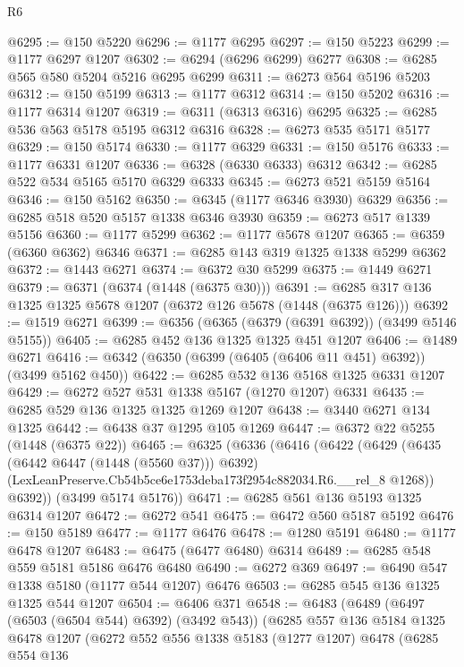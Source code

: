 \begin{lexlean}{R6}
\begin{coremodule}
@6295 := @150 @5220
@6296 := @1177 @6295
@6297 := @150 @5223
@6299 := @1177 @6297 @1207
@6302 := @6294 (@6296 @6299) @6277
@6308 := @6285 @565 @580 @5204 @5216 @6295 @6299
@6311 := @6273 @564 @5196 @5203
@6312 := @150 @5199
@6313 := @1177 @6312
@6314 := @150 @5202
@6316 := @1177 @6314 @1207
@6319 := @6311 (@6313 @6316) @6295
@6325 := @6285 @536 @563 @5178 @5195 @6312 @6316
@6328 := @6273 @535 @5171 @5177
@6329 := @150 @5174
@6330 := @1177 @6329
@6331 := @150 @5176
@6333 := @1177 @6331 @1207
@6336 := @6328 (@6330 @6333) @6312
@6342 := @6285 @522 @534 @5165 @5170 @6329 @6333
@6345 := @6273 @521 @5159 @5164
@6346 := @150 @5162
@6350 := @6345 (@1177 @6346 @3930) @6329
@6356 := @6285 @518 @520 @5157 @1338 @6346 @3930
@6359 := @6273 @517 @1339 @5156
@6360 := @1177 @5299
@6362 := @1177 @5678 @1207
@6365 := @6359 (@6360 @6362) @6346
@6371 := @6285 @143 @319 @1325 @1338 @5299 @6362
@6372 := @1443 @6271
@6374 := @6372 @30 @5299
@6375 := @1449 @6271
@6379 := @6371 (@6374 (@1448 (@6375 @30)))
@6391 := @6285 @317 @136 @1325 @1325 @5678 @1207 (@6372 @126 @5678 (@1448 (@6375 @126)))
@6392 := @1519 @6271
@6399 := @6356 (@6365 (@6379 (@6391 @6392)) (@3499 @5146 @5155))
@6405 := @6285 @452 @136 @1325 @1325 @451 @1207
@6406 := @1489 @6271
@6416 := @6342 (@6350 (@6399 (@6405 (@6406 @11 @451) @6392)) (@3499 @5162 @450))
@6422 := @6285 @532 @136 @5168 @1325 @6331 @1207
@6429 := @6272 @527 @531 @1338 @5167 (@1270 @1207) @6331
@6435 := @6285 @529 @136 @1325 @1325 @1269 @1207
@6438 := @3440 @6271 @134 @1325
@6442 := @6438 @37 @1295 @105 @1269
@6447 := @6372 @22 @5255 (@1448 (@6375 @22))
@6465 := @6325
    (@6336
      (@6416
        (@6422
          (@6429
            (@6435 (@6442 @6447 (@1448 (@5560 @37))) @6392)
            (LexLeanPreserve.Cb54b5ce6e1753deba173f2954c882034.R6.__rel_8 @1268))
          @6392))
      (@3499 @5174 @5176))
@6471 := @6285 @561 @136 @5193 @1325 @6314 @1207
@6472 := @6272 @541
@6475 := @6472 @560 @5187 @5192
@6476 := @150 @5189
@6477 := @1177 @6476
@6478 := @1280 @5191
@6480 := @1177 @6478 @1207
@6483 := @6475 (@6477 @6480) @6314
@6489 := @6285 @548 @559 @5181 @5186 @6476 @6480
@6490 := @6272 @369
@6497 := @6490 @547 @1338 @5180 (@1177 @544 @1207) @6476
@6503 := @6285 @545 @136 @1325 @1325 @544 @1207
@6504 := @6406 @371
@6548 := @6483
    (@6489
      (@6497 (@6503 (@6504 @544) @6392) (@3492 @543))
      (@6285
        @557
        @136
        @5184
        @1325
        @6478
        @1207
        (@6272
          @552
          @556
          @1338
          @5183
          (@1277 @1207)
          @6478
          (@6285
            @554
            @136

\end{coremodule}
\end{lexlean}
